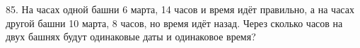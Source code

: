85. На часах одной башни 6 марта, 14 часов и время идёт правильно, а на часах другой башни 10 марта, 8 часов, но время идёт назад. Через сколько часов на двух башнях будут одинаковые даты и одинаковое время?\\
